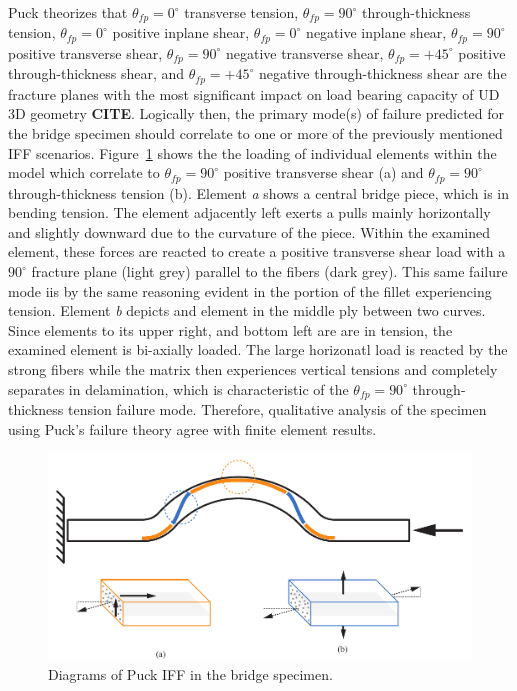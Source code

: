 Puck theorizes that $\theta_{fp} = 0^{\circ}$ transverse tension, $\theta_{fp} = 90^{\circ}$ through-thickness tension, $\theta_{fp} = 0^{\circ}$ positive inplane shear, $\theta_{fp} = 0^{\circ}$ negative inplane shear, $\theta_{fp} = 90^{\circ}$ positive transverse shear, $\theta_{fp} = 90^{\circ}$ negative transverse shear, $\theta_{fp} = +45^{\circ}$ positive through-thickness shear, and $\theta_{fp} = +45^{\circ}$ negative through-thickness shear are the fracture planes with the most significant impact on load bearing capacity of UD 3D geometry \large{\textbf{CITE}}. Logically then, the primary mode(s) of failure predicted for the bridge specimen should correlate to one or more of the previously mentioned IFF scenarios. Figure~\ref{fig:puck-failure-qualitative} shows the the loading of individual elements within the model which correlate to $\theta_{fp} = 90^{\circ}$ positive transverse shear (a) and $\theta_{fp} = 90^{\circ}$ through-thickness tension (b). Element \emph{a} shows a central bridge piece, which is in bending tension. The element adjacently left exerts a pulls mainly horizontally and slightly downward due to the curvature of the piece. Within the examined element, these forces are reacted to create a positive transverse shear load with a $90^{\circ}$ fracture plane (light grey) parallel to the fibers (dark grey). This same failure mode iis by the same reasoning evident in the portion of the fillet experiencing tension. Element \emph{b} depicts and element in the middle ply between two curves. Since elements to its upper right, and bottom left are are in tension, the examined element is bi-axially loaded. The large horizonatl load is reacted by the strong fibers while the matrix then experiences vertical tensions and completely separates in delamination, which is characteristic of the $\theta_{fp} = 90^{\circ}$ through-thickness tension failure mode. Therefore, qualitative analysis of the specimen using Puck's failure theory agree with finite element results.\\

\begin{figure}[htp]
\centering
\includegraphics[width=1\textwidth]{./figures/fea/puck-failure-qualitative}
\caption{Diagrams of Puck IFF in the bridge specimen.}
\label{fig:puck-failure-qualitative}
\end{figure}

